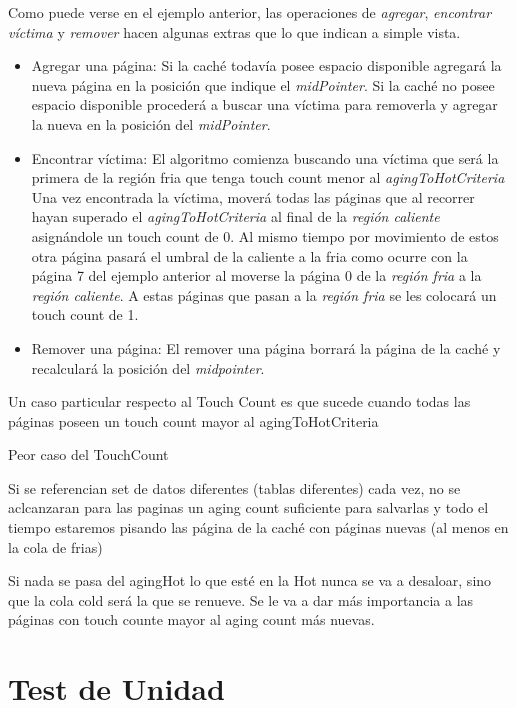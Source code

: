 \documentclass[11pt, a4paper, spanish]{article}
\begin{document}
Como puede verse en el ejemplo anterior, las operaciones de \textit{agregar}, \textit{encontrar víctima} y \textit{remover} hacen algunas extras que lo que indican a simple vista.

\begin{itemize}
	\item{Agregar una p\'agina:
		Si la cach\'e todav\'ia posee espacio disponible agregar\'a la nueva p\'agina en la posici\'on que indique el \textit{midPointer}.
		Si la cach\'e no posee espacio disponible proceder\'a a buscar una v\'ictima para removerla y agregar la nueva en la posici\'on del \textit{midPointer}.
	}
	\item{Encontrar v\'ictima: }
		El algoritmo comienza buscando una v\'ictima que ser\'a la primera de la regi\'on fria que tenga touch count menor al \textit{agingToHotCriteria}
		Una vez encontrada la v\'ictima, mover\'a todas las p\'aginas que al recorrer hayan superado el  \textit{agingToHotCriteria} al
		final de la \textit{regi\'on caliente} asign\'andole un touch count de 0. Al mismo tiempo por movimiento de estos otra p\'agina pasar\'a
		el umbral de la caliente a la fria como ocurre con la p\'agina 7 del ejemplo anterior al moverse la p\'agina 0 de la \textit{regi\'on fria}
		a la \textit{regi\'on caliente}. A estas p\'aginas que pasan a la \textit{regi\'on fria} se les colocar\'a un touch count de 1.
		
	\item{Remover una p\'agina: }
		El remover una p\'agina borrar\'a la p\'agina de la cach\'e y recalcular\'a la posici\'on del \textit{midpointer}.
\end{itemize}

Un caso particular respecto al Touch Count es que sucede cuando todas las p\'aginas poseen un touch count mayor al agingToHotCriteria


Peor caso del TouchCount

Si se referencian set de datos diferentes (tablas diferentes) cada vez, no se aclcanzaran para las paginas un aging count suficiente
para salvarlas y todo el tiempo estaremos pisando las p\'agina de la caché con p\'aginas nuevas (al menos en la cola de frias)

Si nada se pasa del agingHot lo que esté en la Hot nunca se va a desaloar, sino que la cola cold ser\'a la que se renueve.
Se le va a dar m\'as importancia a las p\'aginas con touch counte mayor al aging count m\'as nuevas.

\newpage
\section{Test de Unidad}
\end{document}
